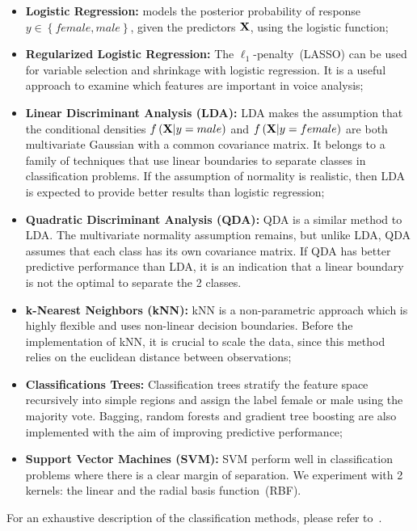 \begin{itemize}
	\item \textbf{Logistic Regression:} models the posterior probability of response $y\in \left\lbrace female, male \right\rbrace$, given the predictors $\mathbf{X}$, using the logistic function;
	
	\item \textbf{Regularized Logistic Regression:} The $\ell_1$-penalty~(LASSO) can be used for variable selection and shrinkage with logistic regression. 
	It is a useful approach to examine which features are  important in voice analysis;
	
	\item \textbf{Linear Discriminant Analysis (LDA):} LDA makes the assumption that the conditional densities $f \left(\mathbf{X}|y=male \right)$ and $ f \left(\mathbf{X}|y=female \right)$ are both multivariate Gaussian with a common covariance matrix. 
	It belongs to a family of techniques that use linear boundaries to separate classes in classification problems. 
	If the assumption of normality is realistic, then LDA is expected to provide better results than logistic regression;
	
	\item \textbf{Quadratic Discriminant Analysis (QDA):} QDA is a similar method to LDA. 
	The multivariate normality assumption remains, but unlike LDA, QDA assumes that each class has its own covariance matrix. 
	If QDA has better predictive performance than LDA, it is an indication that a linear boundary is not the optimal to separate the 2 classes.
	
	\item \textbf{k-Nearest Neighbors (kNN):} kNN is a non-parametric approach which is highly flexible and uses non-linear decision boundaries. 
	Before the implementation of kNN, it is crucial to scale the data, since this method relies on the euclidean distance between observations;
	
	\item \textbf{Classifications Trees:} Classification trees stratify the feature space recursively into simple regions and assign the label female or male using the majority vote. 
	Bagging, random forests and gradient tree boosting are also implemented with the aim of improving predictive performance;
	
	\item \textbf{Support Vector Machines (SVM):} SVM perform well in classification problems where there is a clear margin of separation. 
	We experiment with 2 kernels: the linear and the radial basis function~(RBF).
\end{itemize}
For an exhaustive description of the classification methods, please refer to~\cite{ESL_2001}.
